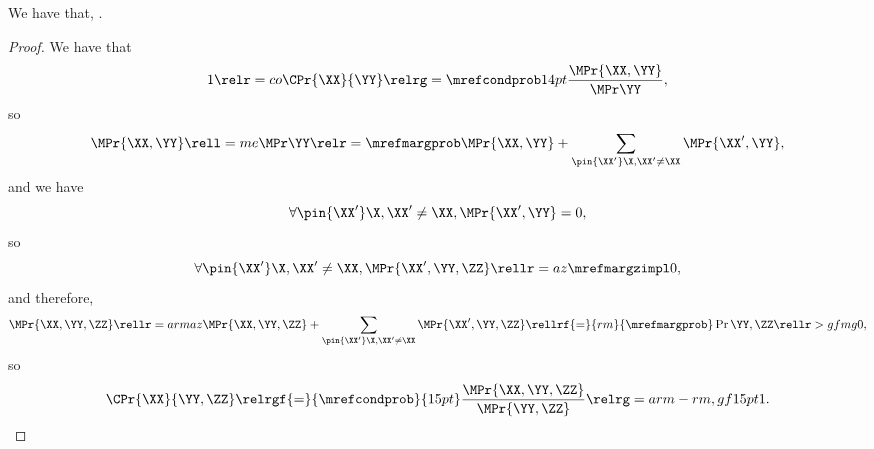 \begin{proposition}
  We have that, \ponecindprop.%
\end{proposition}

\begin{proof}
  We have that 
  $$1 \relr = co \CPr{\XX}{\YY} \relrg = {\mrefcondprob} 14pt \frac{\MPr{\XX, \YY}}{\MPr\YY},$$
  so 
  \def\notx{\pin{\XX'}\X, \XX' \ne \XX}
  $$\MPr{\XX, \YY} \rell = me \MPr\YY \relr = {\mrefmargprob} \MPr{\XX, \YY} + \sum_{\notx}\MPr{\XX', \YY},$$
  and we have
  $$\forall \notx, \MPr{\XX',\YY} = 0,$$
  so
  $$\forall \notx, \MPr{\XX',\YY,\ZZ} \rellr = az {\mrefmargzimpl} 0,$$
  and therefore, $$\MPr{\XX,\YY,\ZZ} \rellr = arm az \MPr{\XX,\YY,\ZZ} + \sum_{\notx}\MPr{\XX',\YY,\ZZ}
  \rellrf{=}{rm}{\mrefmargprob} \Pr{\YY, \ZZ} \rellr > gf mg 0,$$
  so $$\CPr{\XX}{\YY, \ZZ} 
  \relrgf{=}{\mrefcondprob}{15pt} \frac{\MPr{\XX, \YY, \ZZ}}{\MPr{\YY, \ZZ}} 
  \relrg = arm-rm,gf 15pt 1.$$%
\end{proof}
